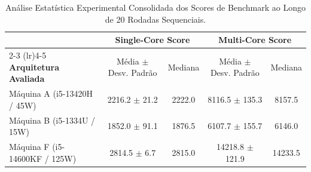 \begin{table}[htbp]
\centering
\caption{Análise Estatística Experimental Consolidada dos Scores de Benchmark ao Longo de 20 Rodadas Sequenciais.}
\label{tab:estatistica_benchmark_premium}
\small
\begin{tabular}{lcccc}
\hline
 & \multicolumn{2}{c}{\textbf{Single-Core Score}} & \multicolumn{2}{c}{\textbf{Multi-Core Score}} \\
\cmidrule(lr){2-3} \cmidrule(lr){4-5}
\textbf{Arquitetura Avaliada} & Média $\pm$ Desv. Padrão & Mediana & Média $\pm$ Desv. Padrão & Mediana \\
\hline
Máquina A (i5-13420H / 45W) & 2216.2 $\pm$ 21.2 & 2222.0 & 8116.5 $\pm$ 135.3 & 8157.5 \\
Máquina B (i5-1334U / 15W) & 1852.0 $\pm$ 91.1 & 1876.5 & 6107.7 $\pm$ 155.7 & 6146.0 \\
Máquina F (i5-14600KF / 125W) & 2814.5 $\pm$ 6.7 & 2815.0 & 14218.8 $\pm$ 121.9 & 14233.5 \\
\hline
\end{tabular}
\end{table}